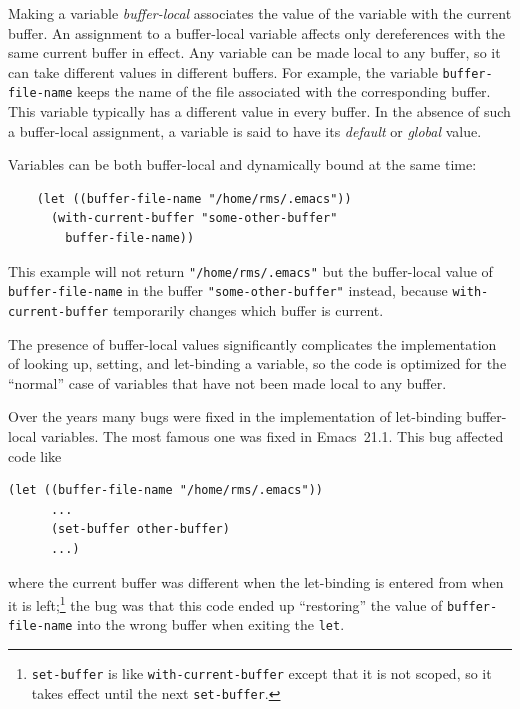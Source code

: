 \documentclass[format=acmsmall,screen]{acmart}
\begin{document}
Making a variable \emph{buffer-local} associates the value of the variable
with the current buffer.  An assignment to a buffer-local variable
affects only dereferences with the same current buffer in effect.
Any variable can be made local to any buffer, so it can take
different values in different buffers.  For example, the variable
\texttt{buffer-file-name} keeps the name of the file associated with the
corresponding buffer.  This variable typically has a different value in
every buffer.  In the absence of such a buffer-local assignment, a variable
is said to have its \emph{default} or \emph{global} value.

Variables can be both buffer-local and dynamically bound at the same time:
\begin{Verbatim}
    (let ((buffer-file-name "/home/rms/.emacs"))
      (with-current-buffer "some-other-buffer"
        buffer-file-name))
\end{Verbatim}
This example will not return \texttt{"/home/rms/.emacs"} but the
buffer-local value of \texttt{buffer-file-name} in the buffer
\texttt{"some-other-buffer"} instead, because \texttt{with-current-buffer}
temporarily changes which buffer is current.

The presence of buffer-local values significantly complicates the
implementation of looking up, setting, and let-binding a variable, so the
code is optimized for the ``normal'' case of variables that have not been
made local to any buffer.

Over the years many bugs were fixed in the implementation of let-binding
buffer-local variables.  The most famous one was fixed in Emacs~21.1.
This bug affected code like
\begin{Verbatim}[samepage=true]
    (let ((buffer-file-name "/home/rms/.emacs"))
      ...
      (set-buffer other-buffer)
      ...)
\end{Verbatim}
where the current buffer was different when the let-binding is entered from
when it is left;\footnote{\texttt{set-buffer} is like
  \texttt{with-current-buffer} except that it is not scoped, so it takes
  effect until the next \texttt{set-buffer}.} the bug was that this code
ended up ``restoring'' the value of \texttt{buffer-file-name} into the
wrong buffer when exiting the \texttt{let}.
\end{document}
